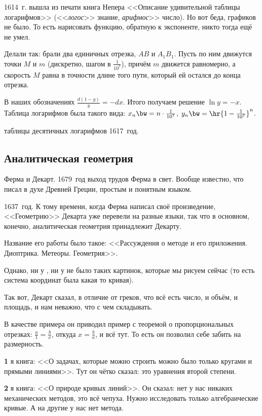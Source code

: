 \documentclass[a4paper,oneside,fleqn,10pt]{article}
\begin{document}
1614~г. вышла из печати книга Непера <<Описание удивительной таблицы логарифмов>>
(<<\emph{логос}>> знание, \emph{арифмос}>> число).
Но вот беда, графиков не было. То есть нарисовать функцию, обратную к экспоненте,
никто тогда ещё не умел.

Делали так: брали два единичных отрезка, $AB$ и $A_1B_1$.
Пусть по ним движутся точки $M$ и $m$ (дискретно, шагом в $\frac{1}{10^7}$),
причём $m$ движется равномерно, а скорость $M$ равна в точности длине того
пути, который ей остался до конца отрезка.

В наших обозначениях $\frac{d(1-y)}{y} = -dx$.
Итого получаем решение $\ln y = -x$.
Таблица логарифмов была такого вида:
$x_n \bw= n \cdot \frac1{10^7}$, $y_n \bw= \hr{1-\frac1{10^7}}^n$.

 таблицы десятичных логарифмов 1617~год.


\subsection{Аналитическая геометрия}

Ферма и Декарт. 1679~год выход трудов Ферма в свет. Вообще известно, что 
писал в духе Древней Греции, простым и понятным языком.

 1637~год. К тому времени, когда Ферма написал своё произведение,
<<Геометрию>> Декарта уже перевели на разные языки,
так что в основном, конечно, аналитическая геометрия принадлежит Декарту.

Название его работы было такое: <<Рассуждения о методе и его приложения.
Диоптрика. Метеоры. Геометрия>>.

Однако, ни у , ни у  не было таких картинок, которые мы
рисуем сейчас (то есть система координат была какая то кривая).

Так вот, Декарт сказал, в отличие от греков, что всё есть число, и
объём, и площадь, и нам неважно, что с чем складывать.

В качестве примера он приводил пример с теоремой о пропорциональных отрезках:
$\frac{a}{1} = \frac{b}{x}$, откуда $x = \frac{b}{a}$, и всё тут.
То есть он позволил себе забить на размерность.

\textbf{1} я книга: <<О задачах, которые можно строить можно было только кругами и прямыми линиями>>.
Тут он чётко сказал: это уравнения второй степени.

\textbf{2} я книга: <<О природе кривых линий>>. Он сказал: нет у нас никаких механических методов,
это всё чепуха. Нужно исследовать только алгебраические кривые. А на другие у нас нет метода.
\end{document}
